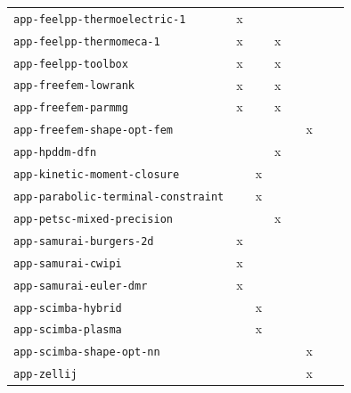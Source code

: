 \begin{longtable}{@{}p{}ccccccc@{}}
\nolinkurl{app-feelpp-thermoelectric-1} & x &  &  &  &  &  &  \\
\nolinkurl{app-feelpp-thermomeca-1} & x &  & x &  &  &  &  \\
\nolinkurl{app-feelpp-toolbox} & x &  & x &  &  &  &  \\
\nolinkurl{app-freefem-lowrank} & x &  & x &  &  &  &  \\
\nolinkurl{app-freefem-parmmg} & x &  & x &  &  &  &  \\
\nolinkurl{app-freefem-shape-opt-fem} &  &  &  &  & x &  &  \\
\nolinkurl{app-hpddm-dfn} &  &  & x &  &  &  &  \\
\nolinkurl{app-kinetic-moment-closure} &  & x &  &  &  &  &  \\
\nolinkurl{app-parabolic-terminal-constraint} &  & x &  &  &  &  &  \\
\nolinkurl{app-petsc-mixed-precision} &  &  & x &  &  &  &  \\
\nolinkurl{app-samurai-burgers-2d} & x &  &  &  &  &  &  \\
\nolinkurl{app-samurai-cwipi} & x &  &  &  &  &  &  \\
\nolinkurl{app-samurai-euler-dmr} & x &  &  &  &  &  &  \\
\nolinkurl{app-scimba-hybrid} &  & x &  &  &  &  &  \\
\nolinkurl{app-scimba-plasma} &  & x &  &  &  &  &  \\
\nolinkurl{app-scimba-shape-opt-nn} &  &  &  &  & x &  &  \\
\nolinkurl{app-zellij} &  &  &  &  & x &  &  \\
\bottomrule
\end{longtable}
